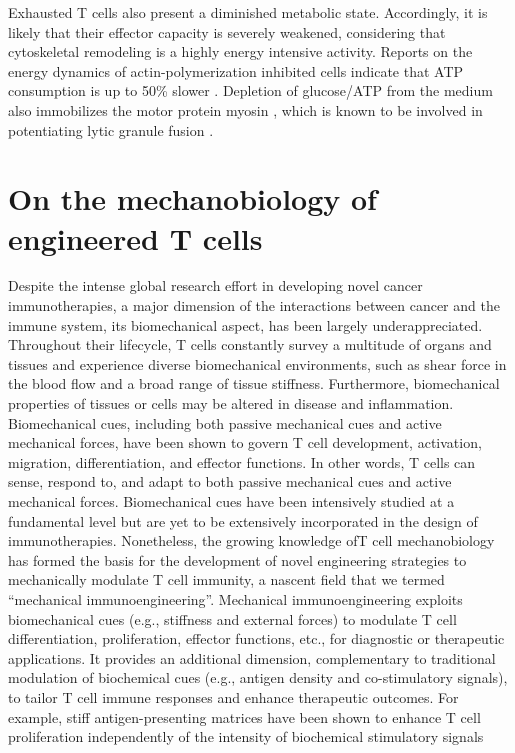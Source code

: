 Exhausted T cells also present a diminished metabolic state. Accordingly, it is likely that their effector capacity is severely weakened, considering that cytoskeletal remodeling is a highly energy intensive activity. Reports on the energy dynamics of actin-polymerization inhibited cells indicate that ATP consumption is up to 50\% slower \cite{Bernstein2002, Ahmed2015}. Depletion of glucose/ATP from the medium also immobilizes the motor protein myosin \cite{Xu2014}, which is known to be involved in potentiating lytic granule fusion \cite{Basu2016}.

\section{On the mechanobiology of engineered T cells}

Despite the intense global research effort in developing novel cancer immunotherapies, a major dimension of the interactions between cancer and the immune system, its biomechanical aspect, has been largely underappreciated. Throughout their lifecycle, T cells constantly survey a multitude of organs and tissues and experience diverse biomechanical environments, such as shear force in the blood flow and a broad range of tissue stiffness. Furthermore, biomechanical properties of tissues or cells may be altered in disease and inflammation. Biomechanical cues, including both passive mechanical cues and active mechanical forces, have been shown to govern T cell development, activation, migration, differentiation, and effector functions. In other words, T cells can sense, respond to, and adapt to both passive mechanical cues and active mechanical forces. Biomechanical cues have been intensively studied at a fundamental level but are yet to be extensively incorporated in the design of immunotherapies. Nonetheless, the growing knowledge ofT cell mechanobiology has formed the basis for the development of novel engineering strategies to mechanically modulate T cell immunity, a nascent field that we termed “mechanical immunoengineering”. Mechanical immunoengineering exploits biomechanical cues (e.g., stiffness and external forces) to modulate T cell differentiation, proliferation, effector functions, etc., for diagnostic or therapeutic applications. It provides an additional dimension, complementary to traditional modulation of biochemical cues (e.g., antigen density and co-stimulatory signals), to tailor T cell immune responses and enhance therapeutic outcomes. For example, stiff antigen-presenting matrices have been shown to enhance T cell proliferation independently of the intensity of biochemical stimulatory signals \cite{Lei2020}

